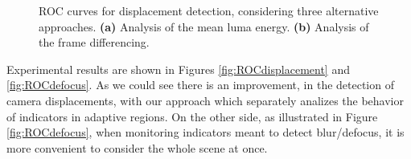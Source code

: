 \documentclass{llncs}
\newcommand{\gi}[1]{{\textcolor{red}{[\small \textbf{Giacomo}: #1]}}}
\begin{document}
%
%
%
%
\begin{figure}[t]
\centering
{}
\caption{ROC curves for displacement detection, considering three alternative approaches. \textbf{(a)} Analysis of the mean luma energy. \textbf{(b)} Analysis of the frame differencing.}
\label{fig:ROC}
\end{figure}
Experimental results are shown in Figures \ref{fig:ROCdisplacement} and \ref{fig:ROCdefocus}.
As we could see there is an improvement, in the detection of camera displacements, with our approach which separately analizes the behavior of indicators in adaptive regions.
On the other side, as illustrated in Figure \ref{fig:ROCdefocus}, when monitoring indicators meant to detect blur/defocus, it is more convenient to consider the whole scene at once.
\end{document}
